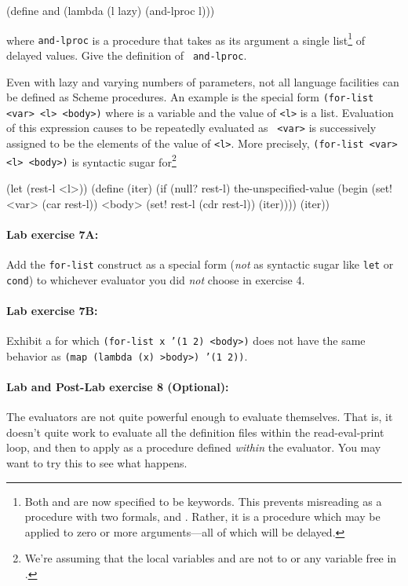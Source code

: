 \beginlisp
(define and (lambda (l lazy) (and-lproc l)))
\endlisp

where {\tt and-lproc} is a procedure that takes as its argument a single
list\footnote{Both  and  are now specified to
be keywords.  This prevents misreading  as
a procedure with two formals,  and .  Rather, it is a
procedure which may be applied to zero or more arguments---all of which
will be delayed.} of delayed values. Give the definition of {\tt
and-lproc}.

\medskip

Even with lazy and varying numbers of parameters, not all language
facilities can be defined as Scheme procedures.  An example is the
special form {\tt (for-list <var> <l> <body>)} where  is a
variable and the value of {\tt <l>} is a list.  Evaluation of this
expression causes  to be repeatedly evaluated as {\tt
<var>} is successively assigned to be the elements of the value of
{\tt <l>}.  More precisely, {\tt (for-list <var> <l> <body>)} is
syntactic sugar for\footnote{We're assuming that the local variables
 and  are not  to  or
any variable free in .}

\beginlisp
(let (rest-l <l>))
  (define (iter)
    (if (null? rest-l)
        the-unspecified-value
        (begin
          (set! <var> (car rest-l))
          <body>
          (set! rest-l (cdr rest-l))
          (iter))))
  (iter))
\endlisp

\paragraph{Lab exercise 7A:}
Add the {\tt for-list} construct as a special form ({\em not} as syntactic
sugar like {\tt let} or {\tt cond}) to whichever evaluator you did {\em not}
choose in exercise 4.

\paragraph{Lab exercise 7B:}
Exhibit a  for which {\tt (for-list x '(1 2) <body>)}
does not have the same behavior as {\tt (map (lambda (x) >body>) '(1
2))}.


\paragraph{Lab and Post-Lab exercise 8 (Optional):}
The evaluators are not quite powerful enough to evaluate themselves.  That
is, it doesn't quite work to evaluate all the  definition
files within the  read-eval-print loop, and then to apply
 as a procedure defined {\em within} the 
evaluator.  You may want to try this to see what happens.

